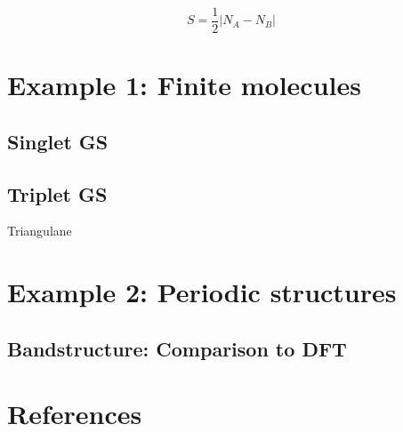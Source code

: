 \documentclass[amsmath,%
amssymb,prb,superscriptaddress]{revtex4}
\begin{document}
\begin{equation}\label{eq:Lieb_theorem}
S = \frac{1}{2}\left|N_{A}-N_{B}\right|
\end{equation}


\section{Example 1: Finite molecules}

\subsection{Singlet GS}



\subsection{Triplet GS}
Triangulane


\section{Example 2: Periodic structures}

\subsection{Bandstructure: Comparison to DFT}


\section{References}
\end{document}

